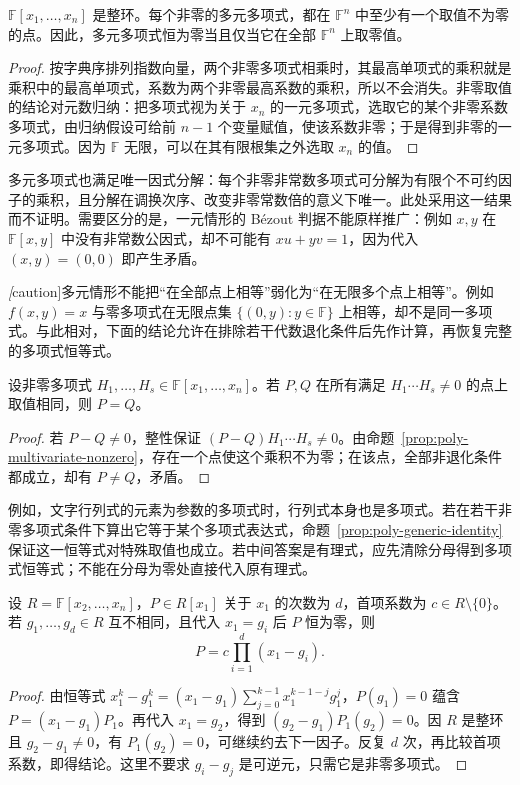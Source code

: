 \begin{proposition}
\label{prop:poly-multivariate-nonzero}
$\mathbb F[x_1,\ldots,x_n]$ 是整环。每个非零的多元多项式，都在 $\mathbb F^n$ 中至少有一个取值不为零的点。因此，多元多项式恒为零当且仅当它在全部 $\mathbb F^n$ 上取零值。
\end{proposition}
\begin{proof}
按字典序排列指数向量，两个非零多项式相乘时，其最高单项式的乘积就是乘积中的最高单项式，系数为两个非零最高系数的乘积，所以不会消失。非零取值的结论对元数归纳：把多项式视为关于 $x_n$ 的一元多项式，选取它的某个非零系数多项式，由归纳假设可给前 $n-1$ 个变量赋值，使该系数非零；于是得到非零的一元多项式。因为 $\mathbb F$ 无限，可以在其有限根集之外选取 $x_n$ 的值。
\end{proof}

多元多项式也满足唯一因式分解：每个非零非常数多项式可分解为有限个不可约因子的乘积，且分解在调换次序、改变非零常数倍的意义下唯一。此处采用这一结果而不证明。需要区分的是，一元情形的 Bézout 判据不能原样推广：例如 $x,y$ 在 $\mathbb F[x,y]$ 中没有非常数公因式，却不可能有 $xu+yv=1$，因为代入 $(x,y)=(0,0)$ 即产生矛盾。

\emph[caution]{多元情形不能把“在全部点上相等”弱化为“在无限多个点上相等”}。例如 $f(x,y)=x$ 与零多项式在无限点集 $\{(0,y):y\in\mathbb F\}$ 上相等，却不是同一多项式。与此相对，下面的结论允许在排除若干代数退化条件后先作计算，再恢复完整的多项式恒等式。

\begin{proposition}[非退化取值上的恒等式]
\label{prop:poly-generic-identity}
设非零多项式 $H_1,\ldots,H_s\in\mathbb F[x_1,\ldots,x_n]$。若 $P,Q$ 在所有满足 $H_1\cdots H_s\ne0$ 的点上取值相同，则 $P=Q$。
\end{proposition}
\begin{proof}
若 $P-Q\ne0$，整性保证 $(P-Q)H_1\cdots H_s\ne0$。由命题~\ref{prop:poly-multivariate-nonzero}，存在一个点使这个乘积不为零；在该点，全部非退化条件都成立，却有 $P\ne Q$，矛盾。
\end{proof}

例如，文字行列式的元素为参数的多项式时，行列式本身也是多项式。若在若干非零多项式条件下算出它等于某个多项式表达式，命题~\ref{prop:poly-generic-identity} 保证这一恒等式对特殊取值也成立。若中间答案是有理式，应先清除分母得到多项式恒等式；不能在分母为零处直接代入原有理式。

\begin{proposition}[以多项式为根的分解]
\label{prop:poly-polynomial-roots}
设 $R=\mathbb F[x_2,\ldots,x_n]$，$P\in R[x_1]$ 关于 $x_1$ 的次数为 $d$，首项系数为 $c\in R\setminus\{0\}$。若 $g_1,\ldots,g_d\in R$ 互不相同，且代入 $x_1=g_i$ 后 $P$ 恒为零，则
\[
    P=c\prod_{i=1}^d(x_1-g_i).
\]
\end{proposition}
\begin{proof}
由恒等式 $x_1^k-g_1^k=(x_1-g_1)\sum_{j=0}^{k-1}x_1^{k-1-j}g_1^j$，$P(g_1)=0$ 蕴含 $P=(x_1-g_1)P_1$。再代入 $x_1=g_2$，得到 $(g_2-g_1)P_1(g_2)=0$。因 $R$ 是整环且 $g_2-g_1\ne0$，有 $P_1(g_2)=0$，可继续约去下一因子。反复 $d$ 次，再比较首项系数，即得结论。这里不要求 $g_i-g_j$ 是可逆元，只需它是非零多项式。
\end{proof}


